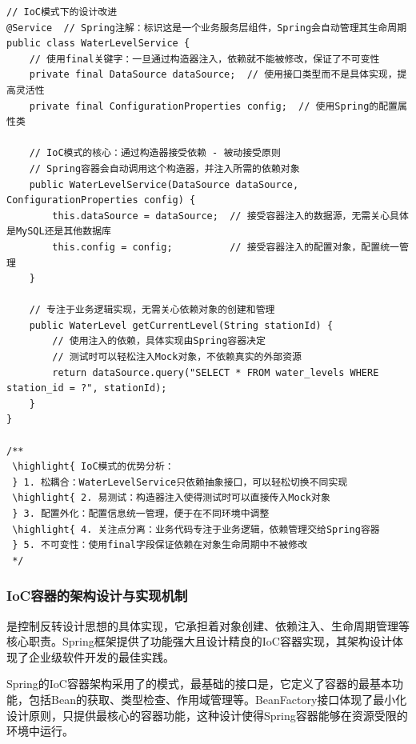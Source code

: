\begin{lstlisting}[style=java]
// IoC模式下的设计改进
@Service  // Spring注解：标识这是一个业务服务层组件，Spring会自动管理其生命周期
public class WaterLevelService {
    // 使用final关键字：一旦通过构造器注入，依赖就不能被修改，保证了不可变性
    private final DataSource dataSource;  // 使用接口类型而不是具体实现，提高灵活性
    private final ConfigurationProperties config;  // 使用Spring的配置属性类
    
    // IoC模式的核心：通过构造器接受依赖 - 被动接受原则
    // Spring容器会自动调用这个构造器，并注入所需的依赖对象
    public WaterLevelService(DataSource dataSource, ConfigurationProperties config) {
        this.dataSource = dataSource;  // 接受容器注入的数据源，无需关心具体是MySQL还是其他数据库
        this.config = config;          // 接受容器注入的配置对象，配置统一管理
    }
    
    // 专注于业务逻辑实现，无需关心依赖对象的创建和管理
    public WaterLevel getCurrentLevel(String stationId) {
        // 使用注入的依赖，具体实现由Spring容器决定
        // 测试时可以轻松注入Mock对象，不依赖真实的外部资源
        return dataSource.query("SELECT * FROM water_levels WHERE station_id = ?", stationId);
    }
}

/**
 \highlight{ IoC模式的优势分析：
 } 1. 松耦合：WaterLevelService只依赖抽象接口，可以轻松切换不同实现
 \highlight{ 2. 易测试：构造器注入使得测试时可以直接传入Mock对象
 } 3. 配置外化：配置信息统一管理，便于在不同环境中调整
 \highlight{ 4. 关注点分离：业务代码专注于业务逻辑，依赖管理交给Spring容器
 } 5. 不可变性：使用final字段保证依赖在对象生命周期中不被修改
 */
\end{lstlisting}

\hypertarget{iocux5bb9ux5668ux7684ux67b6ux6784ux8bbeux8ba1ux4e0eux5b9eux73b0ux673aux5236}{%
\subsubsection{IoC容器的架构设计与实现机制}\label{iocux5bb9ux5668ux7684ux67b6ux6784ux8bbeux8ba1ux4e0eux5b9eux73b0ux673aux5236}}

是控制反转设计思想的具体实现，它承担着对象创建、依赖注入、生命周期管理等核心职责。Spring框架提供了功能强大且设计精良的IoC容器实现，其架构设计体现了企业级软件开发的最佳实践。

Spring的IoC容器架构采用了的模式，最基础的接口是，它定义了容器的最基本功能，包括Bean的获取、类型检查、作用域管理等。BeanFactory接口体现了最小化设计原则，只提供最核心的容器功能，这种设计使得Spring容器能够在资源受限的环境中运行。

